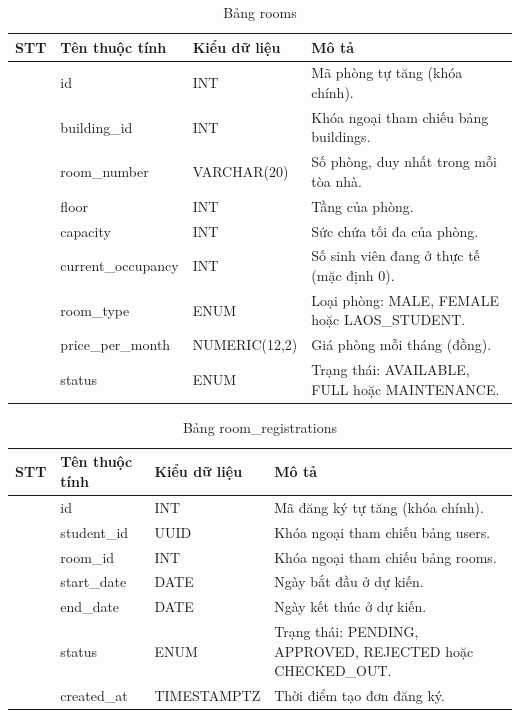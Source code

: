 \documentclass[13pt,a4paper]{extarticle}
\numberwithin{figure}{section}
\numberwithin{table}{section}
\begin{document}
	\begin{table}[H]
		\centering
		\caption{Bảng rooms}
		\label{tab:rooms}
		\begingroup
		\setlength{\tabcolsep}{3pt}
		\begin{tabularx}{\textwidth}{|>{\centering\arraybackslash}p{1cm}|>{\raggedright\arraybackslash}p{3.8cm}|>{\raggedright\arraybackslash}p{3.2cm}|Y|}
			\hline
			\centering\textbf{STT} & \centering\textbf{Tên thuộc tính} & \centering\textbf{Kiểu dữ liệu} & \centering\arraybackslash\textbf{Mô tả} \\
			 & id & INT & Mã phòng tự tăng (khóa chính). \\
			 & building\_id & INT & Khóa ngoại tham chiếu bảng buildings. \\
			 & room\_number & VARCHAR(20) & Số phòng, duy nhất trong mỗi tòa nhà. \\
			 & floor & INT & Tầng của phòng. \\
			 & capacity & INT & Sức chứa tối đa của phòng. \\
			 & current\_occupancy & INT & Số sinh viên đang ở thực tế (mặc định 0). \\
			 & room\_type & ENUM & Loại phòng: MALE, FEMALE hoặc LAOS\_STUDENT. \\
			 & price\_per\_month & NUMERIC(12,2) & Giá phòng mỗi tháng (đồng). \\
			 & status & ENUM & Trạng thái: AVAILABLE, FULL hoặc MAINTENANCE. \\
			\hline
		\end{tabularx}
		\endgroup
	\end{table}
	
	\begin{table}[H]
		\centering
		\caption{Bảng room\_registrations}
		\label{tab:roomregistrations}
		\begingroup
		\setlength{\tabcolsep}{3pt}
		\begin{tabularx}{\textwidth}{|>{\centering\arraybackslash}p{1cm}|>{\raggedright\arraybackslash}p{3.8cm}|>{\raggedright\arraybackslash}p{3.2cm}|Y|}
			\hline
			\centering\textbf{STT} & \centering\textbf{Tên thuộc tính} & \centering\textbf{Kiểu dữ liệu} & \centering\arraybackslash\textbf{Mô tả} \\
			 & id & INT & Mã đăng ký tự tăng (khóa chính). \\
			 & student\_id & UUID & Khóa ngoại tham chiếu bảng users. \\
			 & room\_id & INT & Khóa ngoại tham chiếu bảng rooms. \\
			 & start\_date & DATE & Ngày bắt đầu ở dự kiến. \\
			 & end\_date & DATE & Ngày kết thúc ở dự kiến. \\
			 & status & ENUM & Trạng thái: PENDING, APPROVED, REJECTED hoặc CHECKED\_OUT. \\
			 & created\_at & TIMESTAMPTZ & Thời điểm tạo đơn đăng ký. \\
			\hline
		\end{tabularx}
		\endgroup
	\end{table}
	
\end{document}
